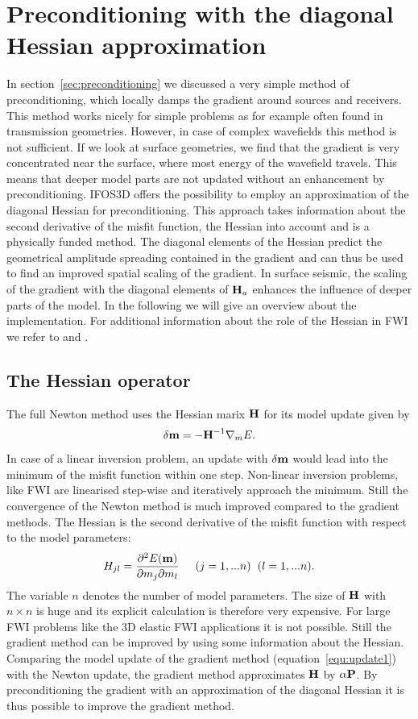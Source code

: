 \section{Preconditioning with the diagonal Hessian approximation}\label{sec:hess}
In section~\ref{sec:preconditioning} we discussed a very simple method of preconditioning, which locally damps the gradient around sources and receivers. This method works nicely for simple problems as for example often found in transmission geometries. However, in case of complex wavefields this method is not sufficient. If we look at surface geometries, we find that the gradient is very concentrated near the surface, where most energy of the wavefield travels. This means that deeper model parts are not updated without an enhancement by preconditioning. IFOS3D offers the  possibility to employ an approximation of the diagonal Hessian for preconditioning. This approach takes information about the second derivative of the misfit function, the Hessian into account and is a physically funded method. The diagonal elements of the Hessian predict the geometrical amplitude spreading contained in the gradient and can thus be used  to find an improved  spatial scaling of the gradient. In surface seismic, the scaling of the gradient with the diagonal elements of $\textbf H_a$ enhances the influence of deeper parts of the model. In the following we will give an overview about the implementation. For additional information about the role of the Hessian in FWI we refer to \cite{Pra98, Vir09, Bro11} and \cite{But15}.
\subsection{The Hessian operator}
The full Newton method uses the Hessian marix $\textbf H$ for its model update given by
\begin{equation} \delta\textbf m=-\textbf H^{-1}\nabla_mE.\end{equation} In case of a linear inversion problem, an update with $\delta\textbf m$ would lead into the minimum of the misfit function within one step. Non-linear inversion problems, like FWI are linearised step-wise and iteratively approach the minimum. Still the convergence of the Newton method is much improved compared to the gradient methods.
The Hessian is the second derivative of the misfit function with respect to the model parameters:
\begin{equation}H_{jl}=\frac{\partial^2 E(\textbf m)}{\partial m_j\partial m_l} \hspace{0.5cm} (j=1,...n)\hspace{0.2cm}(l=1,...n). \label{equ:hessb}\end{equation}
The variable $n$ denotes the number of model parameters. The size of $\textbf H$ with $n\times n$ is huge and its explicit calculation is therefore very expensive. For large FWI problems like the 3D elastic FWI applications it is not possible. Still the gradient method can be improved by using some information about the Hessian. Comparing the model update of the gradient method (equation~\ref{equ:update1}) with the Newton update, the gradient method approximates $\textbf H$ by $\alpha \textbf P$. By preconditioning the gradient with an approximation of the diagonal Hessian it is thus possible to improve the gradient method.
